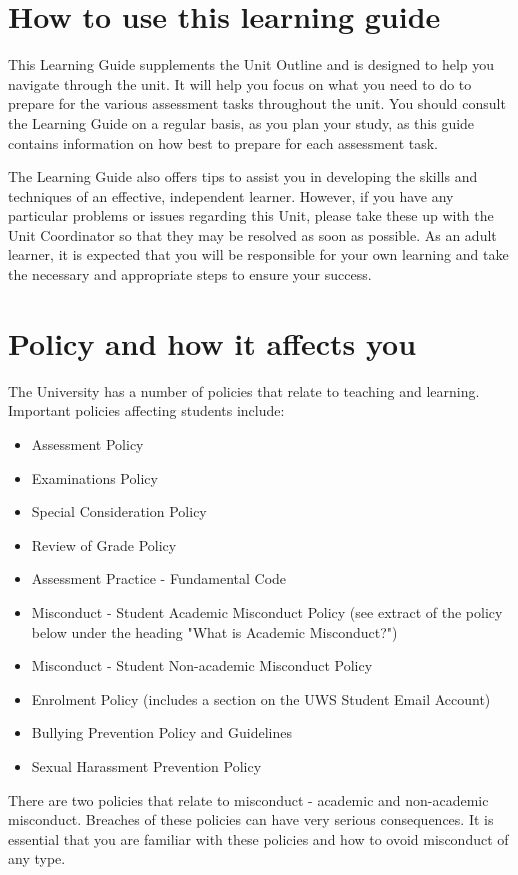 \documentclass[a4paper,oneside]{book}
\begin{document}
\section{How to use this learning guide}

This Learning Guide supplements the Unit Outline and is designed to
help you navigate through the unit.  It will help you focus on what
you need to do to prepare for the various assessment tasks throughout
the unit.  You should consult the Learning Guide on a regular basis,
as you plan your study, as this guide contains information on how best
to prepare for each assessment task.

The Learning Guide also offers tips to assist you in developing the
skills and techniques of an effective, independent learner.  However,
if you have any particular problems or issues regarding this Unit,
please take these up with the Unit Coordinator so that they may be
resolved as soon as possible.  As an adult learner, it is expected
that you will be responsible for your own learning and take the
necessary and appropriate steps to ensure your success.

\section{Policy and how it affects you}

The University has a number of policies that relate to teaching and
learning.  Important policies affecting students include:
\begin{itemize}
\item Assessment Policy
\item Examinations Policy
\item Special Consideration Policy
\item Review of Grade Policy
\item Assessment Practice - Fundamental Code
\item Misconduct - Student Academic Misconduct Policy (see extract of
  the policy below under the heading "What is Academic Misconduct?")
\item Misconduct - Student Non-academic Misconduct Policy
\item Enrolment Policy (includes a section on the UWS Student Email Account)
\item Bullying Prevention Policy and Guidelines
\item Sexual Harassment Prevention Policy
\end{itemize}
There are two policies that relate to misconduct - academic and
non-academic misconduct.  Breaches of these policies can have very
serious consequences.  It is essential that you are familiar with
these policies and how to ovoid misconduct of any type.
\end{document}
